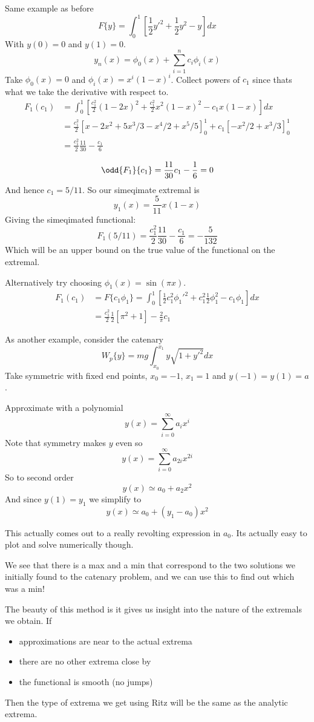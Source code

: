 \documentclass{E:/Documents/Latex/myassignment}
\begin{document}
Same example as before
\[F\{y\} = \int_0^1 \left[\frac12 y'^2 + \frac12 y^2 - y\right] dx\]
With $y(0) = 0$ and $y(1) = 0$.
\[y_n(x) = \phi_0(x) + \sum_{i=1}^n c_i \phi_i (x)\]
Take $\phi_0(x) = 0$ and $\phi_i(x) = x^i (1-x)^i$.
Collect powers of $c_1$ since thats what we take the derivative with respect to.
\begin{align*}
	F_1(c_1) &= \int_0^1 \left[ \frac{c_1^2}{2} \left(1-2x\right)^2 + \frac{c_1^2}{2} x^2(1-x)^2 - c_1 x(1-x)\right] dx\\
	&=\frac{c_1^2}{2} \left[x - 2x^2 + 5x^3/3 - x^4/2 + x^5/5\right]_0^1 + c_1 \left[-x^2/2 + x^3/3\right]_0^1\\
	&= \frac{c_1^2}{2} \frac{11}{30} - \frac{c_1}{6}
\end{align*}

\[\odd{F_1}{c_1} = \frac{11}{30}c_1 - \frac16 = 0\]
And hence $c_1 = 5/11$.
So our simeqimate extremal is
\[y_1(x) = \frac5{11} x(1-x)\]
Giving the simeqimated functional:
\[F_1(5/11) = \frac{c_1^2}{2} \frac{11}{30} - \frac{c_1}{6} = -\frac{5}{132}\]
Which will be an upper bound on the true value of the functional on the extremal.

Alternatively try choosing $\phi_1(x) = \sin(\pi x)$.
\begin{align*}
	F_1(c_1) &= F\{c_1\phi_1\} = \int_0^1 \left[\frac12 c_1^2\phi_1'^2 + c_1^2 \frac12 \phi_1^2 - c_1 \phi_1\right] dx\\
	&= \frac{c_1^2}{2} \frac12 \left[\pi^2 +1\right] - \frac{2}{\pi} c_1
\end{align*}

As another example, consider the catenary 
\[W_p\{y\} = mg \int_{x_0}^{x_1} y\sqrt{1+y'^2}dx\]
Take symmetric with fixed end points, $x_0 = -1$, $x_1 = 1$ and $y(-1) = y(1) = a$.

Approximate with a polynomial
\[y(x) = \sum_{i=0}^\infty a_i x^i\]
Note that symmetry makes $y$ even so
\[y(x) = \sum_{i=0}^\infty a_{2i} x^{2i}\]
So to second order
\[y(x) \simeq a_0 + a_2 x^2\]
And since $y(1) = y_1$ we simplify to 
\[y(x) \simeq a_0 + (y_1-a_0)x^2\]

This actually comes out to a really revolting expression in $a_0$. Its actually easy to plot and solve numerically though.

We see that there is a max and a min that correspond to the two solutions we initially found to the catenary problem, and we can use this to find out which was a min!

The beauty of this method is it gives us insight into the nature of the extremals we obtain. If 
\begin{itemize}
	\item approximations are near to the actual extrema
	\item there are no other extrema close by
	\item the functional is smooth (no jumps)
\end{itemize}
Then the type of extrema we get using Ritz will be the same as the analytic extrema.
\end{document}
